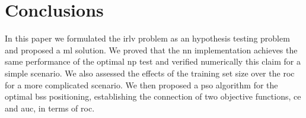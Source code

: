 \documentclass[conference,final]{IEEEtran}
\begin{document}
 
\section{Conclusions}
\label{sec:conc}

In this paper we formulated the \ac{irlv} problem as an hypothesis testing problem and proposed a \ac{ml} solution. We proved that the \ac{nn} implementation achieves the same performance of the optimal \ac{np} test and verified numerically this claim for a simple scenario. We also assessed the effects of the training set size over the \ac{roc} for a more complicated scenario. We then proposed a \ac{pso}  algorithm for the  optimal \acp{bs} positioning, establishing the connection of two objective functions, \ac{ce} and \ac{auc}, in terms of  \ac{roc}.


\renewcommand*{\bibfont}{\footnotesize}

\printbibliography
\end{document}
